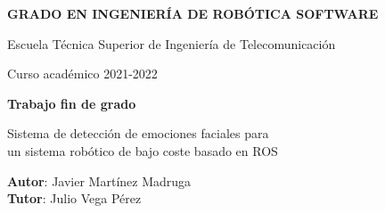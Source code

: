 \thispagestyle{empty}
\vspace{2cm}

\begin{figure}[htb]
  \centerline{}
\end{figure}

\begin{center}
  {\Large {\bf GRADO EN INGENIERÍA DE ROBÓTICA SOFTWARE}}
  \vspace{5mm}
 
  {\large {Escuela Técnica Superior de Ingeniería de Telecomunicación}}
  \vspace{5mm}

  {\large {Curso académico 2021-2022}}

  \vspace{1cm}

  {\large {\bf Trabajo fin de grado}}

  \vspace{2cm}

  {\Large {Sistema de detección de emociones faciales para\\
               un sistema robótico de bajo coste basado en ROS\\[1cm] }}

  \vspace{5cm}
  {\bf Autor}: Javier Martínez Madruga \\
  {\bf Tutor}: Julio Vega Pérez
\end{center}

\clearpage
\thispagestyle{empty}
